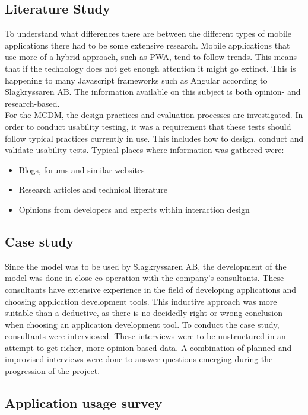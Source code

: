 \subsection{Literature Study}

To understand what differences there are between the different types of mobile applications there had to be some extensive research. Mobile applications that use more of a hybrid approach, such as PWA, tend to follow trends. This means that if the technology does not get enough attention it might go extinct. This is happening to many Javascript frameworks such as Angular according to Slagkryssaren AB. The information available on this subject is both opinion- and research-based.\\

For the MCDM, the design practices and evaluation processes are investigated. 
In order to conduct usability testing, it was a requirement that these tests should follow typical practices currently in use. This includes how to design, conduct and validate usability tests.
Typical places where information was gathered were:

\begin{itemize}
    \item Blogs, forums and similar websites
    \item Research articles and technical literature 
    \item Opinions from developers and experts within interaction design
\end{itemize}

\subsection{Case study}
Since the model was to be used by Slagkryssaren AB, the development of the model was done in close co-operation with the company’s consultants. These consultants have extensive experience in the field of developing applications and choosing application development tools. This inductive approach was more suitable than a deductive, as there is no decidedly right or wrong conclusion when choosing an application development tool.
\newline
To conduct the case study, consultants were interviewed. These interviews were to be unstructured in an attempt to get richer, more opinion-based data. A combination of planned and improvised interviews were done to answer questions emerging during the progression of the project. 

\subsection{Application usage survey}

